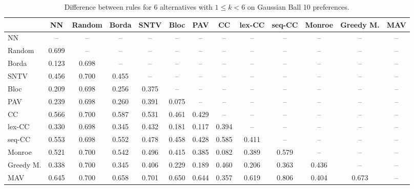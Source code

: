 
\begin{table*}[h!]
\centering
\begin{tabular}{lcccccccccccc}
\toprule
 & NN & Random & Borda & SNTV & Bloc & PAV & CC & lex-CC & seq-CC & Monroe & Greedy M. & MAV \\
\midrule
NN & -- & -- & -- & -- & -- & -- & -- & -- & -- & -- & -- & -- \\
Random & 0.699 & -- & -- & -- & -- & -- & -- & -- & -- & -- & -- & -- \\
Borda & 0.123 & 0.698 & -- & -- & -- & -- & -- & -- & -- & -- & -- & -- \\
SNTV & 0.456 & 0.700 & 0.455 & -- & -- & -- & -- & -- & -- & -- & -- & -- \\
Bloc & 0.209 & 0.698 & 0.256 & 0.375 & -- & -- & -- & -- & -- & -- & -- & -- \\
PAV & 0.239 & 0.698 & 0.260 & 0.391 & 0.075 & -- & -- & -- & -- & -- & -- & -- \\
CC & 0.566 & 0.700 & 0.587 & 0.531 & 0.461 & 0.429 & -- & -- & -- & -- & -- & -- \\
lex-CC & 0.330 & 0.698 & 0.345 & 0.432 & 0.181 & 0.117 & 0.394 & -- & -- & -- & -- & -- \\
seq-CC & 0.553 & 0.698 & 0.552 & 0.478 & 0.458 & 0.428 & 0.585 & 0.411 & -- & -- & -- & -- \\
Monroe & 0.521 & 0.700 & 0.542 & 0.496 & 0.415 & 0.385 & 0.082 & 0.389 & 0.579 & -- & -- & -- \\
Greedy M. & 0.338 & 0.700 & 0.345 & 0.406 & 0.229 & 0.189 & 0.460 & 0.206 & 0.363 & 0.436 & -- & -- \\
MAV & 0.645 & 0.700 & 0.658 & 0.701 & 0.650 & 0.644 & 0.357 & 0.619 & 0.806 & 0.404 & 0.673 & -- \\
\bottomrule
\end{tabular}

\caption{Difference between rules for 6 alternatives with $1 \leq k < 6$ on Gaussian Ball 10 preferences.}
\end{table*}

